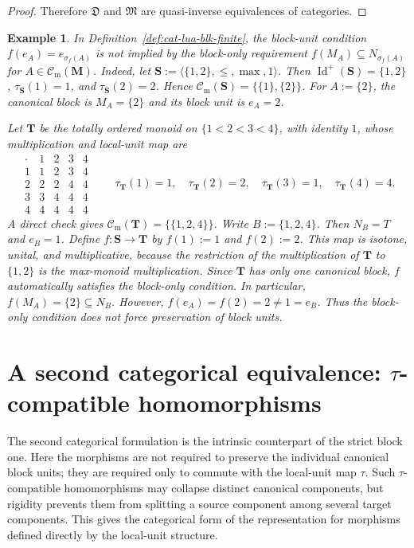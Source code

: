 \documentclass[pdflatex,sn-mathphys-num]{sn-jnl}
\theoremstyle{thmstyleone}%
\theoremstyle{thmstyletwo}%
\newtheorem{example}[theorem]{Example}
\theoremstyle{thmstylethree}%
\newcommand{\PosId}{\operatorname{Id}^{+}}
\newcommand{\Cm}{\mathcal C_{\mathrm m}}
\begin{document}
\begin{proof}
Therefore \(\mathfrak D\) and \(\mathfrak M\) are quasi-inverse equivalences of categories.
\end{proof}


\begin{example}\label{ex:block-preserving-not-unit-preserving}
In Definition~\ref{def:cat-lua-blk-finite}, the block-unit condition \(f(e_A)=e_{\sigma_f(A)}\) is not implied by the block-only requirement \(f(M_A)\subseteq N_{\sigma_f(A)}\) for \(A\in \Cm(\mathbf M)\).
Indeed, let \(\mathbf S:=\langle \{1,2\},\le,\max,1\rangle\).
Then \(\PosId(\mathbf S)=\{1,2\}\), \(\tau_{\mathbf S}(1)=1\), and \(\tau_{\mathbf S}(2)=2\).
Hence \(\Cm(\mathbf S)=\bigl\{\{1\},\{2\}\bigr\}\).
For \(A:=\{2\}\), the canonical block is \(M_A=\{2\}\) and its block unit is \(e_A=2\).

Let \(\mathbf T\) be the totally ordered monoid on \(\{1<2<3<4\}\), with identity \(1\), whose multiplication and local-unit map are
\[
\begin{array}{c|cccc}
\cdot &1&2&3&4\\ \hline
1&1&2&3&4\\
2&2&2&4&4\\
3&3&4&4&4\\
4&4&4&4&4
\end{array}
\qquad
\tau_{\mathbf T}(1)=1,\quad \tau_{\mathbf T}(2)=2,\quad
\tau_{\mathbf T}(3)=1,\quad \tau_{\mathbf T}(4)=4.
\]
A direct check gives \(\Cm(\mathbf T)=\bigl\{\{1,2,4\}\bigr\}\).
Write \(B:=\{1,2,4\}\).
Then \(N_B=T\) and \(e_B=1\).
Define \(f\colon \mathbf S\to \mathbf T\) by \(f(1):=1\) and \(f(2):=2\).
This map is isotone, unital, and multiplicative, because the restriction of the multiplication of \(\mathbf T\) to \(\{1,2\}\) is the max-monoid multiplication.
Since \(\mathbf T\) has only one canonical block, \(f\) automatically satisfies the block-only condition.
In particular, \(f(M_A)=\{2\}\subseteq N_B\).
However, \(f(e_A)=f(2)=2\ne 1=e_B\).
Thus the block-only condition does not force preservation of block units.
\end{example}


\section{A second categorical equivalence: \texorpdfstring{\(\tau\)}{tau}-compatible homomorphisms}
\label{sec:taucomp-categorical-equivalence}

The second categorical formulation is the intrinsic counterpart of the strict block one.
Here the morphisms are not required to preserve the individual canonical block units; they are required only to commute with the local-unit map \(\tau\).
Such \(\tau\)-compatible homomorphisms may collapse distinct canonical components, but rigidity prevents them from splitting a source component among several target components.
This gives the categorical form of the representation for morphisms defined directly by the local-unit structure.
\end{document}
